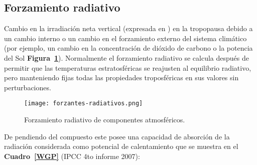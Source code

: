 \subsection{Forzamiento radiativo}
Cambio en la irradiación neta vertical (expresada en \wattpersquaremetrenp) en la tropopausa debido a un cambio interno o un cambio en el forzamiento externo del sistema climático (por ejemplo, un cambio en la concentración de dióxido de carbono o la potencia del Sol \textbf{Figura~\ref{CGWP}}). Normalmente el forzamiento radiativo se calcula después de permitir que las temperaturas estratosféricas se reajusten al equilibrio radiativo, pero manteniendo fijas todas las propiedades troposféricas en sus valores sin perturbaciones.

\begin{figure}[!htbp]
\begin{center}
\texttt{[image: forzantes-radiativos.png]}
\caption{Forzamiento radiativo de componentes atmosféricos.}
\label{CGWP}
\end{center}
\end{figure}

De pendiendo del compuesto este posee una capacidad de absorción de la radiación considerada como potencial de calentamiento que se muestra en el \textbf{Cuadro~\ref{WGP}} (IPCC 4to informe 2007):

